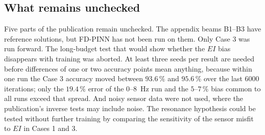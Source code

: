 \subsection*{What remains unchecked}

Five parts of the publication remain unchecked. The appendix beams B1--B3 have reference solutions, but FD-PINN has not been run on them. Only Case 3 was run forward. The long-budget test that would show whether the $EI$ bias disappears with training was aborted. At least three seeds per result are needed before differences of one or two accuracy points mean anything, because within one run the Case 3 accuracy moved between $93.6\,\%$ and $95.6\,\%$ over the last 6000 iterations; only the $19.4\,\%$ error of the 0--8~Hz run and the $5$--$7\,\%$ bias common to all runs exceed that spread. And noisy sensor data were not used, where the publication's inverse tests may include noise. The resonance hypothesis could be tested without further training by comparing the sensitivity of the sensor misfit to $EI$ in Cases 1 and 3.
